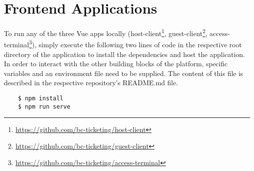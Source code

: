 \section{Frontend Applications}

To run any of the three Vue apps locally (host-client\footnote{\href{https://github.com/bc-ticketing/host-client}{https://github.com/bc-ticketing/host-client}}, guest-client\footnote{\href{https://github.com/bc-ticketing/guest-client}{https://github.com/bc-ticketing/guest-client}}, access-terminal\footnote{\href{https://github.com/bc-ticketing/access-terminal}{https://github.com/bc-ticketing/access-terminal}}), simply execute the following two lines of code in the respective root directory of the application to install the dependencies and host the application. In order to interact with the other building blocks of the platform, specific variables and an environment file need to be supplied. The content of this file is described in the respective repository's README.md file.

\begin{lstlisting}
    $ npm install
    $ npm run serve
\end{lstlisting}
